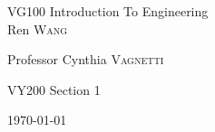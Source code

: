 \begin{center}

\vspace*{0.7in}
\vspace*{0.7in}






\begin{center} \large

VG100 Introduction To Engineering \\

Ren \textsc{Wang}

Professor Cynthia \textsc{Vagnetti} 

VY200 Section 1


{\large \today}


\end{center}



\end{center}
\newpage